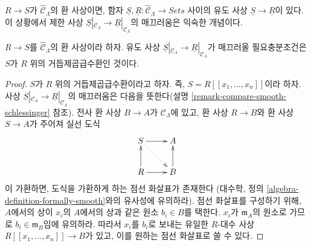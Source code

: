 \noindent
$R \to S$가 $\widehat{\mathcal{C}}_\Lambda$의 환 사상이면,%
함자 $\underline{S}, \underline{R}: \widehat{\mathcal{C}}_\Lambda
\to \textit{Sets}$ 사이의 유도 사상 $\underline{S} \to \underline{R}$이
있다. 이 상황에서 제한 사상
$\underline{S}|_{\mathcal{C}_\Lambda} \to
\underline{R}|_{\mathcal{C}_\Lambda}$의 매끄러움은 익숙한 개념이다.

\begin{lemma}
\label{lemma-smooth-morphism-power-series}
$R \to S$를 $\widehat{\mathcal{C}}_\Lambda$의 환 사상이라 하자. 유도 사상
$\underline{S}|_{\mathcal{C}_\Lambda} \to \underline{R}|_{\mathcal{C}_\Lambda}$가
매끄러울 필요충분조건은 $S$가 $R$ 위의 거듭제곱급수환인 것이다.
\end{lemma}

\begin{proof}
$S$가 $R$ 위의 거듭제곱급수환이라고 하자. 즉,
$S = R[[x_1, \ldots, x_n]]$이라 하자. 사상
$\underline{S}|_{\mathcal{C}_\Lambda} \to \underline{R}|_{\mathcal{C}_\Lambda}$의
매끄러움은 다음을 뜻한다(설명
\ref{remark-compare-smooth-schlessinger} 참조). 전사 환 사상
$B \to A$가 $\mathcal{C}_\Lambda$에 있고, 환 사상 $R \to B$와
환 사상 $S \to A$가 주어져 실선 도식
$$
\xymatrix{
S \ar[r] \ar@{..>}[rd] & A \\
R \ar[u] \ar[r] & B \ar[u]
}
$$
이 가환하면, 도식을 가환하게 하는 점선 화살표가 존재한다
(대수학, 정의 \ref{algebra-definition-formally-smooth}와의 유사성에
유의하라). 점선 화살표를 구성하기 위해, $A$에서의 상이 $x_i$의
$A$에서의 상과 같은 원소 $b_i \in B$를 택한다.
$x_i$가 $\mathfrak m_A$의 원소로 가므로
$b_i \in \mathfrak m_B$임에 유의하라. 따라서 $x_i$를 $b_i$로
보내는 유일한 $R$-대수 사상 $R[[x_1, \ldots, x_n]] \to B$가 있고,
이를 원하는 점선 화살표로 쓸 수 있다.


\end{proof}
